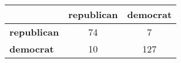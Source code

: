 \begin{tabular}{l|cc}
\toprule
&\textbf{republican} & \textbf{democrat}\\
\midrule
\textbf{republican} & 74 & 7\\
\textbf{democrat} & 10 & 127\\
\bottomrule
\end{tabular}
